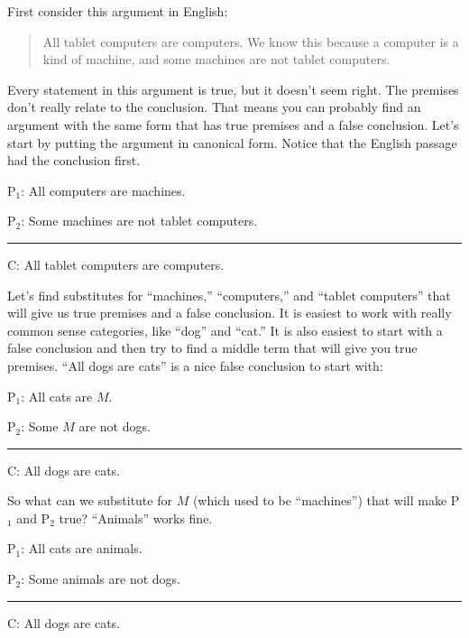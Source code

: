 First consider this argument in English:

\begin{quotation}
\noindent  All tablet computers are computers. We know this because a computer is a kind of machine, and some machines are not tablet computers. 
\end{quotation}

Every statement in this argument is true, but it doesn't seem right. The premises don't really relate to the conclusion. That means you can probably find an argument with the same form that has true premises and a false conclusion. Let's start by putting the argument in canonical form. Notice that the English passage had the conclusion first. 

\begin{earg} 
\item[P$_1$:] All computers are machines.
\item[P$_2$:] Some machines are not tablet computers.
\vspace{-.5em} 
 \item [] \rule{0.4\linewidth}{.5pt} 
\item[C:] All tablet computers are computers.
 \end{earg}

Let's find substitutes for ``machines,'' ``computers,'' and ``tablet computers'' that will give us true premises and a false conclusion. It is easiest to work with really common sense categories, like ``dog'' and ``cat.'' It is also easiest to start with a false conclusion and then try to find a middle term that will give you true premises. ``All dogs are cats'' is a nice false conclusion to start with:  

\begin{earg} 
\item[P$_1$:] All cats are $M$.
\item[P$_2$:] Some $M$ are not dogs. 
\vspace{-.5em} 
 \item [] \rule{0.3\linewidth}{.5pt} 
\item[C:] All dogs are cats.
 \end{earg}

So what can we substitute for $M$ (which used to be ``machines'') that will make P$_1$ and P$_2$ true? ``Animals'' works fine.

\begin{earg} 
\item[P$_1$:] All cats are animals.
\item[P$_2$:] Some animals are not dogs. 
\vspace{-.5em} 
 \item [] \rule{0.3\linewidth}{.5pt} 
\item[C:] All dogs are cats.
 \end{earg}

